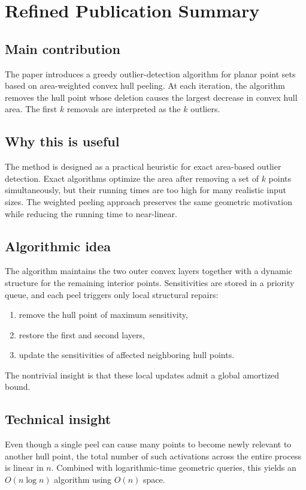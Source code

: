 \section*{Refined Publication Summary}

\subsection*{Main contribution}
The paper introduces a greedy outlier-detection algorithm for planar point sets based on area-weighted convex hull peeling. At each iteration, the algorithm removes the hull point whose deletion causes the largest decrease in convex hull area. The first $k$ removals are interpreted as the $k$ outliers.

\subsection*{Why this is useful}
The method is designed as a practical heuristic for exact area-based outlier detection. Exact algorithms optimize the area after removing a set of $k$ points simultaneously, but their running times are too high for many realistic input sizes. The weighted peeling approach preserves the same geometric motivation while reducing the running time to near-linear.

\subsection*{Algorithmic idea}
The algorithm maintains the two outer convex layers together with a dynamic structure for the remaining interior points. Sensitivities are stored in a priority queue, and each peel triggers only local structural repairs:
\begin{enumerate}
    \item remove the hull point of maximum sensitivity,
    \item restore the first and second layers,
    \item update the sensitivities of affected neighboring hull points.
\end{enumerate}
The nontrivial insight is that these local updates admit a global amortized bound.

\subsection*{Technical insight}
Even though a single peel can cause many points to become newly relevant to another hull point, the total number of such activations across the entire process is linear in $n$. Combined with logarithmic-time geometric queries, this yields an $O(n \log n)$ algorithm using $O(n)$ space.

